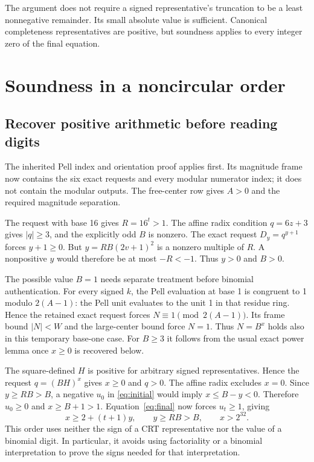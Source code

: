 \documentclass[11pt]{article}
\theoremstyle{remark}\newtheorem{remark}[theorem]{Remark}
\newcommand{\abs}[1]{\lvert #1\rvert}
\begin{document}
The argument does not require a signed representative's truncation to
be a least nonnegative remainder. Its small absolute value is sufficient.
Canonical completeness representatives are positive, but soundness
applies to every integer zero of the final equation.

\section{Soundness in a noncircular order}

\subsection{Recover positive arithmetic before reading digits}

The inherited Pell index and orientation proof applies first. Its
magnitude frame now contains the six exact requests and every modular
numerator index; it does not contain the modular outputs.
The free-center row gives $A>0$ and the required magnitude separation.

The request with base 16 gives $R=16^t>1$. The affine radix condition
$q=6z+3$ gives $\abs q\ge3$, and the explicitly odd $B$ is nonzero.
The exact request $D_y=q^{y+1}$ forces $y+1\ge0$. But
$y=RB(2v+1)^2$ is a nonzero multiple of $R$. A nonpositive $y$
would therefore be at most $-R<-1$. Thus $y>0$ and $B>0$.

The possible value $B=1$ needs separate treatment before binomial
authentication. For every signed $k$, the Pell evaluation at base 1
is congruent to 1 modulo $2(A-1)$: the Pell unit evaluates to the unit 1
in that residue ring. Hence the retained exact request forces
$N\equiv1\pmod{2(A-1)}$. Its frame bound $\abs N<W$ and the
large-center bound force $N=1$. Thus $N=B^x$ holds also in this
temporary base-one case. For $B\ge3$ it follows from the usual exact
power lemma once $x\ge0$ is recovered below.

The square-defined $H$ is positive for arbitrary signed representatives.
Hence the request $q=(BH)^x$ gives $x\ge0$ and $q>0$. The affine
radix excludes $x=0$. Since $y\ge RB>B$, a negative $u_0$ in
\eqref{eq:initial} would imply $x\le B-y<0$. Therefore
$u_0\ge0$ and $x\ge B+1>1$. Equation~\eqref{eq:final} now
forces $u_t\ge1$, giving
\begin{equation}\label{eq:large-x}
 x\ge2+(t+1)y,\qquad y\ge RB>B,\qquad x>2^{32}.
\end{equation}
This order uses neither the sign of a CRT representative nor the value
of a binomial digit. In particular, it avoids using factoriality or a
binomial interpretation to prove the signs needed for that interpretation.
\end{document}
